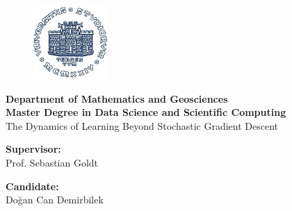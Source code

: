\begin{titlepage} 
\begin{figure}[t] 
    \centering\includegraphics[width=0.25\textwidth]{figures/logo.jpeg}
\end{figure}
\vspace{20mm}

\begin{Large}
 \begin{center}
	\textbf{Department of Mathematics and Geosciences\\ Master Degree in Data Science and Scientific Computing \\}
	\vspace{20mm}
    {\Large{The Dynamics of Learning Beyond Stochastic Gradient Descent  }}\\
	\vspace{10mm}
	{\huge{\bf }}
\end{center}
\end{Large}


\vspace{36mm}
\begin{minipage}[t]{0.47\textwidth}\raggedright
	{\large{\textbf{Supervisor:}\\ Prof. Sebastian Goldt}}
\end{minipage}
\hfill
\begin{minipage}[t]{0.47\textwidth}\raggedleft
	{\large{ \textbf{Candidate:} \\ Doğan Can Demirbilek}}
\end{minipage}

\vspace{25mm}

\hrulefill

\vspace{5mm}


\end{titlepage}